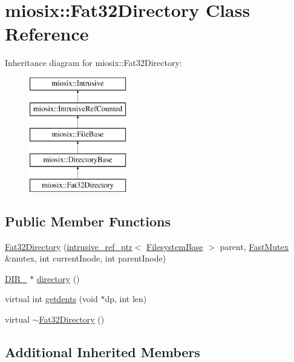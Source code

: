 \hypertarget{classmiosix_1_1_fat32_directory}{\section{miosix\-:\-:Fat32\-Directory Class Reference}
\label{classmiosix_1_1_fat32_directory}
}
Inheritance diagram for miosix\-:\-:Fat32\-Directory\-:\begin{figure}[H]
\begin{center}
\leavevmode
\includegraphics[height=5.000000cm]{classmiosix_1_1_fat32_directory}
\end{center}
\end{figure}
\subsection*{Public Member Functions}
\begin{DoxyCompactItemize}
\item 
\hyperlink{classmiosix_1_1_fat32_directory_a42b331336ef5234e0902baf04193f2db}{Fat32\-Directory} (\hyperlink{classmiosix_1_1intrusive__ref__ptr}{intrusive\-\_\-ref\-\_\-ptr}$<$ \hyperlink{classmiosix_1_1_filesystem_base}{Filesystem\-Base} $>$ parent, \hyperlink{classmiosix_1_1_fast_mutex}{Fast\-Mutex} \&mutex, int current\-Inode, int parent\-Inode)
\item 
\hyperlink{struct_d_i_r__}{D\-I\-R\-\_\-} $\ast$ \hyperlink{classmiosix_1_1_fat32_directory_ace2d4de9e2395b1f1ef208852453d49c}{directory} ()
\item 
virtual int \hyperlink{classmiosix_1_1_fat32_directory_a5ba7fd91334ac2ee3bc2d5d3c8bda850}{getdents} (void $\ast$dp, int len)
\item 
virtual \hyperlink{classmiosix_1_1_fat32_directory_adff79fd236c20a4a0a2713615c8533d5}{$\sim$\-Fat32\-Directory} ()
\end{DoxyCompactItemize}
\subsection*{Additional Inherited Members}


